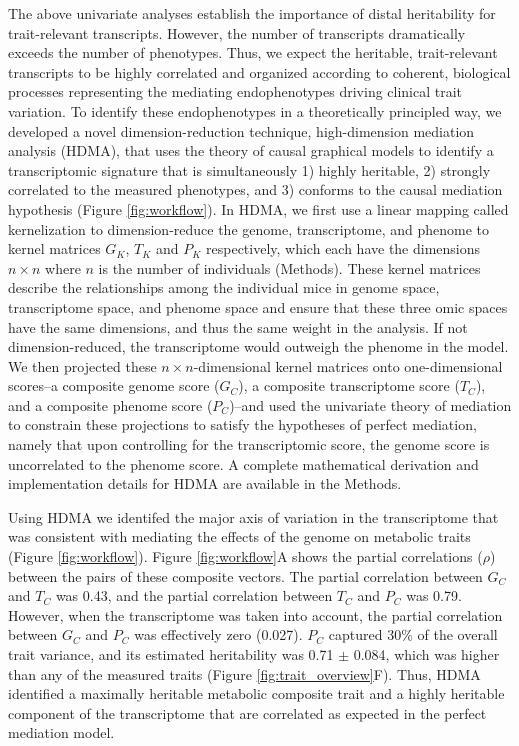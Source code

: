 \documentclass[
]{article}
\begin{document}
The above univariate analyses establish the importance of distal
heritability for trait-relevant transcripts. However, the number of
transcripts dramatically exceeds the number of phenotypes. Thus, we
expect the heritable, trait-relevant transcripts to be highly correlated
and organized according to coherent, biological processes representing
the mediating endophenotypes driving clinical trait variation. To
identify these endophenotypes in a theoretically principled way, we
developed a novel dimension-reduction technique, high-dimension
mediation analysis (HDMA), that uses the theory of causal graphical
models to identify a transcriptomic signature that is simultaneously 1)
highly heritable, 2) strongly correlated to the measured phenotypes, and
3) conforms to the causal mediation hypothesis (Figure
\ref{fig:workflow}). In HDMA, we first use a linear mapping called
kernelization to dimension-reduce the genome, transcriptome, and phenome
to kernel matrices \(G_K\), \(T_K\) and \(P_K\) respectively, which each
have the dimensions \(n\times n\) where \(n\) is the number of
individuals (Methods). These kernel matrices describe the relationships
among the individual mice in genome space, transcriptome space, and
phenome space and ensure that these three omic spaces have the same
dimensions, and thus the same weight in the analysis. If not
dimension-reduced, the transcriptome would outweigh the phenome in the
model. We then projected these \(n \times n\)-dimensional kernel
matrices onto one-dimensional scores--a composite genome score
(\(G_C\)), a composite transcriptome score (\(T_C\)), and a composite
phenome score (\(P_C\))--and used the univariate theory of mediation to
constrain these projections to satisfy the hypotheses of perfect
mediation, namely that upon controlling for the transcriptomic score,
the genome score is uncorrelated to the phenome score. A complete
mathematical derivation and implementation details for HDMA are
available in the Methods.

Using HDMA we identifed the major axis of variation in the transcriptome
that was consistent with mediating the effects of the genome on
metabolic traits (Figure \ref{fig:workflow}). Figure \ref{fig:workflow}A
shows the partial correlations (\(\rho\)) between the pairs of these
composite vectors. The partial correlation between \(G_C\) and \(T_C\)
was 0.43, and the partial correlation between \(T_C\) and \(P_C\) was
0.79. However, when the transcriptome was taken into account, the
partial correlation between \(G_C\) and \(P_C\) was effectively zero
(0.027). \(P_C\) captured 30\% of the overall trait variance, and its
estimated heritability was 0.71 \(\pm\) 0.084, which was higher than any
of the measured traits (Figure \ref{fig:trait_overview}F). Thus, HDMA
identified a maximally heritable metabolic composite trait and a highly
heritable component of the transcriptome that are correlated as expected
in the perfect mediation model.
\end{document}
